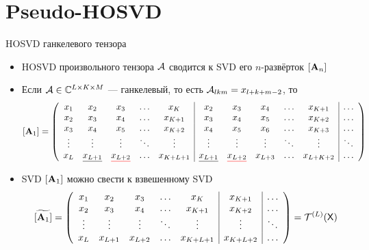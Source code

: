 \documentclass[pdf, unicode, 10pt, notheorems, handout]{beamer}
\begin{document}
\section{Pseudo-HOSVD}
\begin{frame}{HOSVD ганкелевого тензора}
  \begin{itemize}
    \item HOSVD произвольного тензора $\mathcal{A}$ сводится к SVD его
      $n$-развёрток $[\mathbf{A}_n]$\smallskip

    \item Если $\mathcal{A}\in\mathbb{C}^{L\times K \times M}$ --- ганкелевый, то
      есть $\mathcal{A}_{lkm} = x_{l + k + m - 2}$, то\\
      {
        \small{}\arraycolsep
        \[
          [\bfA_1] =
          \left(
            \begin{array}{ccccc|ccccc|c}
              x_1 & x_2 & x_3 & \ldots & x_{K} & x_2 & x_3 & x_4 &
              \ldots & x_{K + 1} & \ldots\\
              x_2 & x_3 & x_4 & \ldots & x_{K + 1} & x_3 & x_4 & x_5 &
              \ldots & x_{K + 2} & \ldots\\
              x_3 & x_4 & x_5 & \ldots & x_{K + 2} & x_4 & x_5 & x_6 &
              \ldots & x_{K + 3} & \ldots\\
              \vdots & \vdots&\vdots & \ddots& \vdots&\vdots& \vdots&
              \vdots&\ddots & \vdots& \ddots\\
              x_L & \underline{x_{L + 1}} & \undercolor{x_{L+2}}{red}
              & \ldots & x_{K +
              L + 1} & \underline{x_{L
              + 1}} & \undercolor{x_{L+2}}{red} & x_{L + 3} &
              \ldots & x_{L + K + 2} & \ldots\\
            \end{array}
          \right)
        \]
      }\smallskip

    \item SVD $[\mathbf{A}_1]$ можно свести к взвешенному SVD
      {\small
        \[
          \widetilde{[\mathbf{A}_1]} = \left(
            \begin{array}{ccccc|c|c}
              x_1 & x_2 & x_3 & \ldots & x_{K} & x_{K + 1} & \ldots\\
              x_2 & x_3 & x_4 & \ldots & x_{K + 1} & x_{K + 2} & \ldots\\
              \vdots & \vdots & \vdots & \ddots & \vdots & \vdots & \ddots\\
              x_L & x_{L + 1} & x_{L + 2} & \ldots & x_{K + L + 1} &
              x_{K + L + 2} & \ldots\\
            \end{array}
          \right) = \mathcal{T}^{(L)}(\mathsf{X})
        \]
      }
  \end{itemize}
\end{frame}
\end{document}
